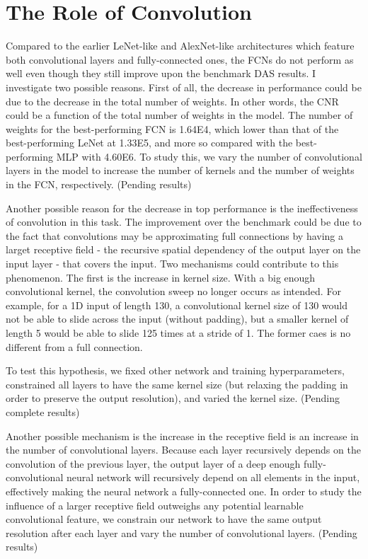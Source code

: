 \section{The Role of Convolution}
Compared to the earlier LeNet-like and AlexNet-like architectures which feature both convolutional layers and fully-connected ones, the FCNs do not perform as well even though they still improve upon the benchmark DAS results. I investigate two possible reasons. First of all, the decrease in performance could be due to the decrease in the total number of weights. In other words, the CNR could be a function of the total number of weights in the model. The number of weights for the best-performing FCN is 1.64E4, which lower than that of the best-performing LeNet at 1.33E5, and more so compared with the best-performing MLP with 4.60E6. To study this, we vary the number of convolutional layers in the model to increase the number of kernels and the number of weights in the FCN, respectively. (Pending results)

Another possible reason for the decrease in top performance is the ineffectiveness of convolution in this task. The improvement over the benchmark could be due to the fact that convolutions may be approximating full connections by having a larget receptive field - the recursive spatial dependency of the output layer on the input layer - that covers the input. Two mechanisms could contribute to this phenomenon. The first is the increase in kernel size. With a big enough convolutional kernel, the convolution sweep no longer occurs as intended. For example, for a 1D input of length 130, a convolutional kernel size of 130 would not be able to slide across the input (without padding), but a smaller kernel of length 5 would be able to slide 125 times at a stride of 1. The former caes is no different from a full connection.

To test this hypothesis, we fixed other network and training hyperparameters, constrained all layers to have the same kernel size (but relaxing the padding in order to preserve the output resolution), and varied the kernel size. (Pending complete results)

Another possible mechanism is the increase in the receptive field is an increase in the number of convolutional layers. Because each layer recursively depends on the convolution of the previous layer, the output layer of a deep enough fully-convolutional neural network will recursively depend on all elements in the input, effectively making the neural network a fully-connected one. In order to study the influence of a larger receptive field outweighs any potential learnable convolutional feature, we constrain our network to have the same output resolution after each layer and vary the number of convolutional layers. (Pending results)



